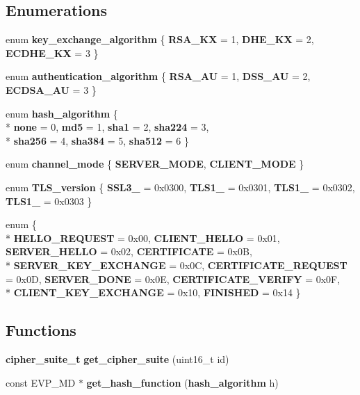 \subsection*{Enumerations}
\begin{DoxyCompactItemize}
\item 
enum {\bf key\+\_\+exchange\+\_\+algorithm} \{ {\bf R\+S\+A\+\_\+\+KX} = 1, 
{\bf D\+H\+E\+\_\+\+KX} = 2, 
{\bf E\+C\+D\+H\+E\+\_\+\+KX} = 3
 \}
\item 
enum {\bf authentication\+\_\+algorithm} \{ {\bf R\+S\+A\+\_\+\+AU} = 1, 
{\bf D\+S\+S\+\_\+\+AU} = 2, 
{\bf E\+C\+D\+S\+A\+\_\+\+AU} = 3
 \}
\item 
enum {\bf hash\+\_\+algorithm} \{ \\*
{\bf none} = 0, 
{\bf md5} = 1, 
{\bf sha1} = 2, 
{\bf sha224} = 3, 
\\*
{\bf sha256} = 4, 
{\bf sha384} = 5, 
{\bf sha512} = 6
 \}
\item 
enum {\bf channel\+\_\+mode} \{ {\bf S\+E\+R\+V\+E\+R\+\_\+\+M\+O\+DE}, 
{\bf C\+L\+I\+E\+N\+T\+\_\+\+M\+O\+DE}
 \}
\item 
enum {\bf T\+L\+S\+\_\+version} \{ {\bf S\+S\+L3\+\_} = 0x0300, 
{\bf T\+L\+S1\+\_} = 0x0301, 
{\bf T\+L\+S1\+\_} = 0x0302, 
{\bf T\+L\+S1\+\_} = 0x0303
 \}
\item 
enum \{ \\*
{\bf H\+E\+L\+L\+O\+\_\+\+R\+E\+Q\+U\+E\+ST} = 0x00, 
{\bf C\+L\+I\+E\+N\+T\+\_\+\+H\+E\+L\+LO} = 0x01, 
{\bf S\+E\+R\+V\+E\+R\+\_\+\+H\+E\+L\+LO} = 0x02, 
{\bf C\+E\+R\+T\+I\+F\+I\+C\+A\+TE} = 0x0B, 
\\*
{\bf S\+E\+R\+V\+E\+R\+\_\+\+K\+E\+Y\+\_\+\+E\+X\+C\+H\+A\+N\+GE} = 0x0C, 
{\bf C\+E\+R\+T\+I\+F\+I\+C\+A\+T\+E\+\_\+\+R\+E\+Q\+U\+E\+ST} = 0x0D, 
{\bf S\+E\+R\+V\+E\+R\+\_\+\+D\+O\+NE} = 0x0E, 
{\bf C\+E\+R\+T\+I\+F\+I\+C\+A\+T\+E\+\_\+\+V\+E\+R\+I\+FY} = 0x0F, 
\\*
{\bf C\+L\+I\+E\+N\+T\+\_\+\+K\+E\+Y\+\_\+\+E\+X\+C\+H\+A\+N\+GE} = 0x10, 
{\bf F\+I\+N\+I\+S\+H\+ED} = 0x14
 \}
\end{DoxyCompactItemize}
\subsection*{Functions}
\begin{DoxyCompactItemize}
\item 
{\bf cipher\+\_\+suite\+\_\+t} {\bf get\+\_\+cipher\+\_\+suite} (uint16\+\_\+t id)
\item 
const E\+V\+P\+\_\+\+MD $\ast$ {\bf get\+\_\+hash\+\_\+function} ({\bf hash\+\_\+algorithm} h)
\end{DoxyCompactItemize}



